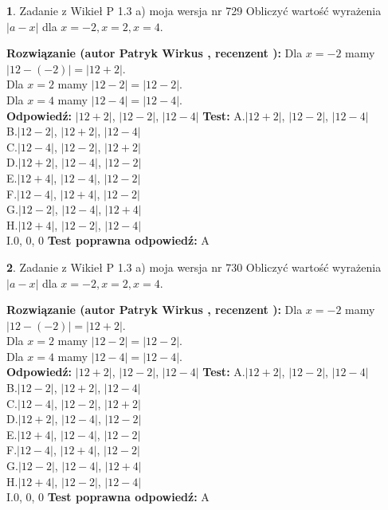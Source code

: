 \documentclass[12pt, a4paper]{article}
\theoremstyle{definition} %
\newtheorem{zad}{}
\newcommand{\zadStart}[1]{\begin{zad}#1\newline}
\newcommand{\zadStop}{\end{zad}}
\newcommand{\rozwStart}[2]{\noindent \textbf{Rozwiązanie (autor #1 , recenzent #2): }\newline}
\newcommand{\rozwStop}{\newline}
\newcommand{\odpStart}{\noindent \textbf{Odpowiedź:}\newline}
\newcommand{\odpStop}{\newline}
\newcommand{\testStart}{\noindent \textbf{Test:}\newline}
\newcommand{\testStop}{\newline}
\newcommand{\kluczStart}{\noindent \textbf{Test poprawna odpowiedź:}\newline}
\newcommand{\kluczStop}{\newline}
\begin{document}
\zadStart{Zadanie z Wikieł P 1.3 a) moja wersja nr 729}
Obliczyć wartość wyrażenia $|a - x|$ dla $x=-2,x=2,x=4$.
\zadStop
\rozwStart{Patryk Wirkus}{}
Dla $x = -2$ mamy $|12 - (-2)| = |12 + 2|$.\\
Dla $x = 2$ mamy $|12 - 2| = |12 - 2|$.\\
Dla $x = 4$ mamy $|12 - 4| = |12 - 4|$.\\
\rozwStop
\odpStart
$|12 + 2|$, $|12 - 2|$, $|12 - 4|$
\odpStop
\testStart
A.$|12 + 2|$, $|12 - 2|$, $|12 - 4|$\\
B.$|12 - 2|$, $|12 + 2|$, $|12 - 4|$\\
C.$|12 - 4|$, $|12 - 2|$, $|12 + 2|$\\
D.$|12 + 2|$, $|12 - 4|$, $|12 - 2|$\\
E.$|12 + 4|$, $|12 - 4|$, $|12 - 2|$\\
F.$|12 - 4|$, $|12 + 4|$, $|12 - 2|$\\
G.$|12 - 2|$, $|12 - 4|$, $|12 + 4|$\\
H.$|12 + 4|$, $|12 - 2|$, $|12 - 4|$\\
I.$0$, $0$, $0$
\testStop
\kluczStart
A
\kluczStop



\zadStart{Zadanie z Wikieł P 1.3 a) moja wersja nr 730}
Obliczyć wartość wyrażenia $|a - x|$ dla $x=-2,x=2,x=4$.
\zadStop
\rozwStart{Patryk Wirkus}{}
Dla $x = -2$ mamy $|12 - (-2)| = |12 + 2|$.\\
Dla $x = 2$ mamy $|12 - 2| = |12 - 2|$.\\
Dla $x = 4$ mamy $|12 - 4| = |12 - 4|$.\\
\rozwStop
\odpStart
$|12 + 2|$, $|12 - 2|$, $|12 - 4|$
\odpStop
\testStart
A.$|12 + 2|$, $|12 - 2|$, $|12 - 4|$\\
B.$|12 - 2|$, $|12 + 2|$, $|12 - 4|$\\
C.$|12 - 4|$, $|12 - 2|$, $|12 + 2|$\\
D.$|12 + 2|$, $|12 - 4|$, $|12 - 2|$\\
E.$|12 + 4|$, $|12 - 4|$, $|12 - 2|$\\
F.$|12 - 4|$, $|12 + 4|$, $|12 - 2|$\\
G.$|12 - 2|$, $|12 - 4|$, $|12 + 4|$\\
H.$|12 + 4|$, $|12 - 2|$, $|12 - 4|$\\
I.$0$, $0$, $0$
\testStop
\kluczStart
A
\kluczStop
\end{document}
